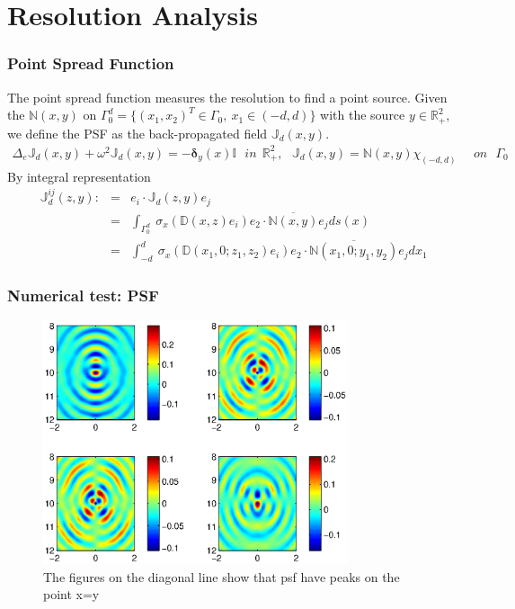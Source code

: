 \documentclass[utf-8,8pt]{beamer}
\newcommand{\R}{\mathbb{R}}
\newcommand{\de}{\delta}
\newcommand{\De}{\Delta}
\newcommand{\N}{\mathbb{N}}
\newcommand{\D}{\mathbb{D}}
\newcommand{\J}{\mathbb{J}}
\newcommand{\ben}{\begin{eqnarray*}}
\newcommand{\een}{\end{eqnarray*}}
\begin{document}
\section{Resolution Analysis}
\begin{frame}
\frametitle{Point Spread Function}
The point spread function measures the resolution to find a point source. Given the $\N(x,y)$ on $\Gamma_0^d=\{(x_1,x_2)^T\in\Gamma_0, \  x_1\in(-d,d)\}$ with the source $y\in \R_+^2$, we define the PSF as the back-propagated field $\J_d(x,y)$.
\ben
\De_e \J_d(x,y) + \omega^2 \J_d(x,y) = -\mathbf{\de}_y(x) \mathbb{I}  \ \ \ in \ \  \R^2_+ , \label{eq_d3} \ \ \
  \J_d(x,y) = \N(x,y)\chi_{(-d,d)} \ \ \ \ \ \ on \ \ \ \Gamma_0
\een
By integral representation
\ben
\J^{ij}_d(z,y):&=&e_i\cdot \J_d(z,y) e_j \\
&=&\int_{\Gamma_0^d} \ \sigma_x(\D(x,z)e_i)e_2\cdot\overline{\N(x,y)}e_j ds(x) \\ \label{fullpsf}
&=&\int_{-d}^d \ \sigma_x(\D(x_1,0;z_1,z_2)e_i)e_2\cdot\overline{\N(x_1,0;y_1,y_2)}e_j dx_1
\een
\end{frame}

\begin{frame}
\frametitle{Numerical test: PSF}
\begin{figure}[h]
  \centering
  \includegraphics[width=0.8\textwidth]{./psf/J.eps}
  \caption{The figures on the diagonal line show that psf have peaks on the point x=y}\label{fig_wgout_ex1}
\end{figure}
\end{frame}
\end{document}
